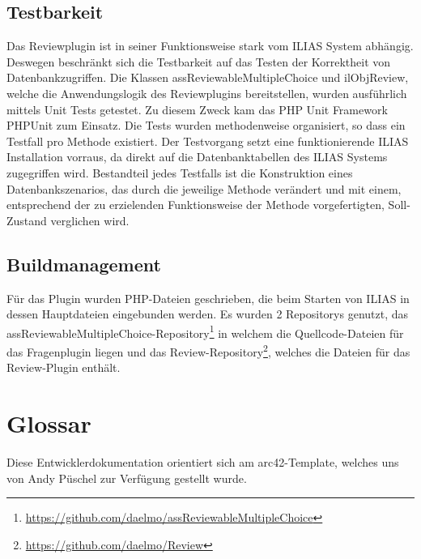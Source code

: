 \documentclass[a4paper]{scrreprt}
\begin{document}
\section{Testbarkeit}

Das Reviewplugin ist in seiner Funktionsweise stark vom ILIAS System abhängig. Deswegen beschränkt sich die Testbarkeit auf das Testen der Korrektheit von Datenbankzugriffen.
Die Klassen assReviewableMultipleChoice und ilObjReview, welche die Anwendungslogik des Reviewplugins bereitstellen, wurden ausführlich mittels Unit Tests getestet.
Zu diesem Zweck kam das PHP Unit Framework PHPUnit zum Einsatz. Die Tests wurden methodenweise organisiert, so dass ein Testfall pro Methode existiert.
Der Testvorgang setzt eine funktionierende ILIAS Installation vorraus, da direkt auf die Datenbanktabellen des ILIAS Systems zugegriffen wird.
Bestandteil jedes Testfalls ist die Konstruktion eines Datenbankszenarios, das durch die jeweilige Methode verändert und mit einem, entsprechend der zu erzielenden Funktionsweise der Methode vorgefertigten, Soll-Zustand verglichen wird.

\section{Buildmanagement}

Für das Plugin wurden PHP-Dateien geschrieben, die beim Starten von ILIAS in dessen Hauptdateien eingebunden werden.
Es wurden 2 Repositorys genutzt, das assReviewableMultipleChoice-Repository\footnote{\url{https://github.com/daelmo/assReviewableMultipleChoice}} in welchem die Quellcode-Dateien für das Fragenplugin liegen und das Review-Repository\footnote{\url{https://github.com/daelmo/Review}}, welches die Dateien für das Review-Plugin enthält.

\chapter{Glossar}

Diese Entwicklerdokumentation orientiert sich am arc42-Template, welches uns von Andy Püschel zur Verfügung gestellt wurde.
\end{document}
